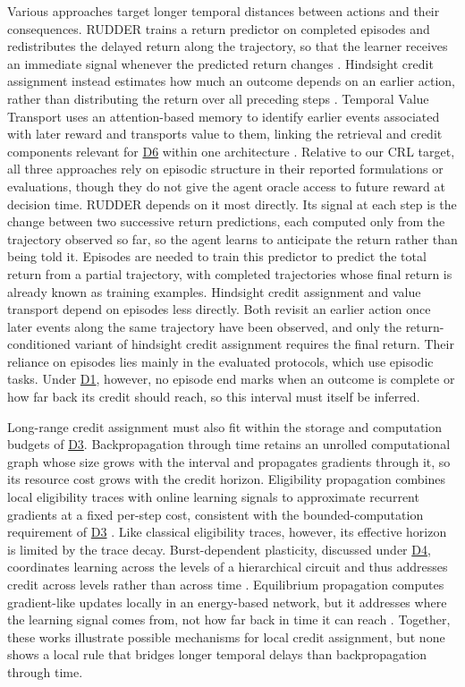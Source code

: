 \documentclass[10pt,journal,compsoc]{IEEEtran}
\DeclareRobustCommand{\Dref}[1]{\hyperref[sec:d#1]{D#1}}
\begin{document}
Various approaches target longer temporal distances between actions and their consequences.
RUDDER trains a return predictor on completed episodes and redistributes the delayed return along the trajectory, so that the learner receives an immediate signal whenever the predicted return changes \cite{arjona2019}.
Hindsight credit assignment instead estimates how much an outcome depends on an earlier action, rather than distributing the return over all preceding steps \cite{harutyunyan2019}.
Temporal Value Transport uses an attention-based memory to identify earlier events associated with later reward and transports value to them, linking the retrieval and credit components relevant for \Dref{6} within one architecture \cite{hung2019}.
Relative to our CRL target, all three approaches rely on episodic structure in their reported formulations or evaluations, though they do not give the agent oracle access to future reward at decision time.
RUDDER depends on it most directly.
Its signal at each step is the change between two successive return predictions, each computed only from the trajectory observed so far, so the agent learns to anticipate the return rather than being told it.
Episodes are needed to train this predictor to predict the total return from a partial trajectory, with completed trajectories whose final return is already known as training examples.
Hindsight credit assignment and value transport depend on episodes less directly.
Both revisit an earlier action once later events along the same trajectory have been observed, and only the return-conditioned variant of hindsight credit assignment requires the final return.
Their reliance on episodes lies mainly in the evaluated protocols, which use episodic tasks.
Under \Dref{1}, however, no episode end marks when an outcome is complete or how far back its credit should reach, so this interval must itself be inferred.

Long-range credit assignment must also fit within the storage and computation budgets of \Dref{3}.
Backpropagation through time retains an unrolled computational graph whose size grows with the interval and propagates gradients through it, so its resource cost grows with the credit horizon.
Eligibility propagation combines local eligibility traces with online learning signals to approximate recurrent gradients at a fixed per-step cost, consistent with the bounded-computation requirement of \Dref{3} \cite{bellec2020}.
Like classical eligibility traces, however, its effective horizon is limited by the trace decay.
Burst-dependent plasticity, discussed under \Dref{4}, coordinates learning across the levels of a hierarchical circuit and thus addresses credit across levels rather than across time \cite{payeur2021}.
Equilibrium propagation computes gradient-like updates locally in an energy-based network, but it addresses where the learning signal comes from, not how far back in time it can reach \cite{scellier2017}.
Together, these works illustrate possible mechanisms for local credit assignment, but none shows a local rule that bridges longer temporal delays than backpropagation through time.
\end{document}
